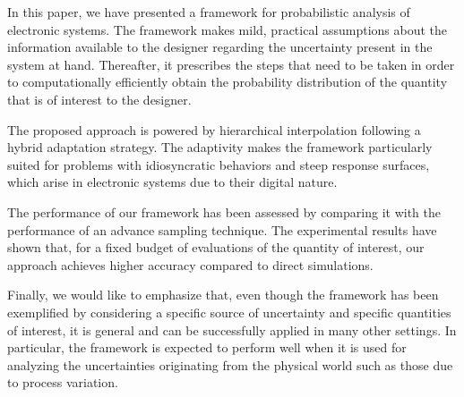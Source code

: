 In this paper, we have presented a framework for probabilistic analysis of
electronic systems. The framework makes mild, practical assumptions about the
information available to the designer regarding the uncertainty present in the
system at hand. Thereafter, it prescribes the steps that need to be taken in
order to computationally efficiently obtain the probability distribution of the
quantity that is of interest to the designer.

The proposed approach is powered by hierarchical interpolation following a
hybrid adaptation strategy. The adaptivity makes the framework particularly
suited for problems with idiosyncratic behaviors and steep response surfaces,
which arise in electronic systems due to their digital nature.

The performance of our framework has been assessed by comparing it with the
performance of an advance sampling technique. The experimental results have
shown that, for a fixed budget of evaluations of the quantity of interest, our
approach achieves higher accuracy compared to direct simulations.

Finally, we would like to emphasize that, even though the framework has been
exemplified by considering a specific source of uncertainty and specific
quantities of interest, it is general and can be successfully applied in many
other settings. In particular, the framework is expected to perform well when it
is used for analyzing the uncertainties originating from the physical world such
as those due to process variation.
